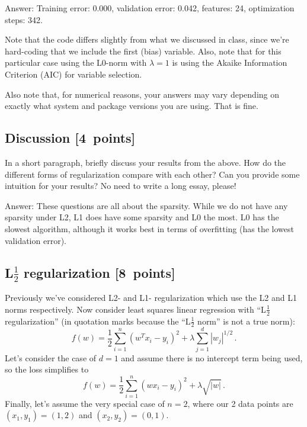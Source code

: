 \documentclass{article}
\newenvironment{answer}{\par\begingroup\color{gre}Answer: }{\endgroup}
\newcommand\pts[1]{\textcolor{pointscolour}{[#1~points]}}
\begin{document}
\begin{answer}
    Training error: 0.000, validation error: 0.042, features: 24, optimization steps: 342.
\end{answer}

Note that the code differs slightly from what we discussed in class,
since we're hard-coding that we include the first (bias) variable.
Also, note that for this particular case using the L0-norm with $\lambda=1$
is using the Akaike Information Criterion (AIC) for variable selection.

Also note that, for numerical reasons, your answers may vary depending on exactly what system and package versions you are using. That is fine.


\subsection{Discussion \pts{4}}

In a short paragraph, briefly discuss your results from the above. How do the
different forms of regularization compare with each other?
Can you provide some intuition for your results? No need to write a long essay, please!

\begin{answer}
    These questions are all about the sparsity. While we do not have any sparsity under L2, L1 does have some sparsity and L0 the most. 
    L0 has the slowest algorithm, although it works best in terms of overfitting (has the lowest validation error). 
\end{answer}

\subsection{L$\frac12$ regularization \pts{8}}

Previously we've considered L2- and L1- regularization which use the L2 and L1 norms respectively. Now consider
least squares linear regression with ``L$\frac12$ regularization'' (in quotation marks because the ``L$\frac12$ norm'' is not a true norm):
\[
f(w) = \frac{1}{2} \sum_{i=1}^n (w^Tx_i - y_i)^2 + \lambda \sum_{j=1}^d |w_j|^{1/2} \, .
\]
Let's consider the case of $d=1$ and
assume there is no intercept term being used, so the loss simplifies to
\[
f(w) = \frac{1}{2} \sum_{i=1}^n (wx_i - y_i)^2 + \lambda \sqrt{|w|} \, .
\]
Finally, let's assume the very special case of $n=2$,
where our 2 data points are $(x_1,y_1)=(1,2)$ and $(x_2,y_2)=(0,1)$.
\end{document}
